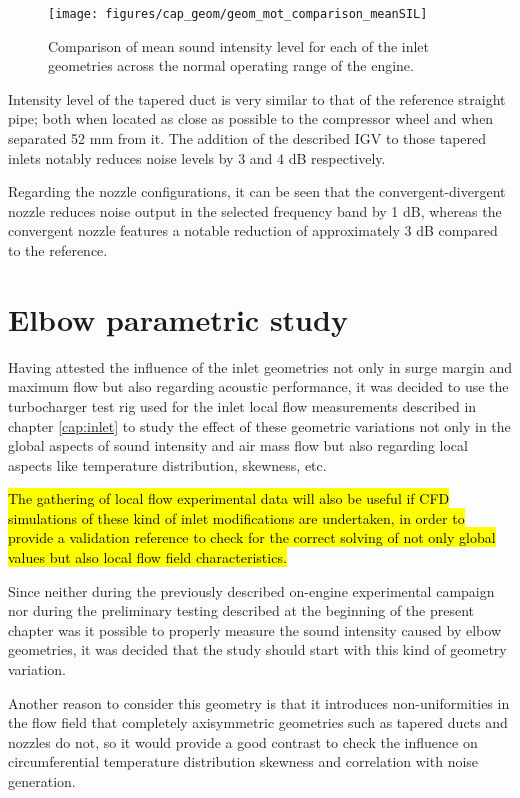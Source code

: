 \begin{figure}[h!]
\centering
\texttt{[image: figures/cap\_geom/geom\_mot\_comparison\_meanSIL]}
\caption{Comparison of mean sound intensity level for each of the inlet geometries across the normal operating range of the engine.}
\label{fig:geom_mot_comparison_meanSIL}
\end{figure}

Intensity level of the tapered duct is very similar to that of the reference straight pipe; both when located as close as possible to the compressor wheel and when separated 52 mm from it. The addition of the described IGV to those tapered inlets notably reduces noise levels by 3 and 4 dB respectively. 

Regarding the nozzle configurations, it can be seen that the convergent-divergent nozzle reduces noise output in the selected frequency band by 1 dB, whereas the convergent nozzle features a notable reduction of approximately 3 dB compared to the reference.

\section{Elbow parametric study}

Having attested the influence of the inlet geometries not only in surge margin and maximum flow but also regarding acoustic performance, it was decided to use the turbocharger test rig used for the inlet local flow measurements described in chapter \ref{cap:inlet} to study the effect of these geometric variations not only in the global aspects of sound intensity and air mass flow but also regarding local aspects like temperature distribution, skewness, etc.

\hl{The gathering of local flow experimental data will also be useful if CFD simulations of these kind of inlet modifications are undertaken, in order to provide a validation reference to check for the correct solving of not only global values but also local flow field characteristics.}

Since neither during the previously described on-engine experimental campaign nor during the preliminary testing described at the beginning of the present chapter was it possible to properly measure the sound intensity caused by elbow geometries, it was decided that the study should start with this kind of geometry variation.

Another reason to consider this geometry is that it introduces non-uniformities in the flow field that completely axisymmetric geometries such as tapered ducts and nozzles do not, so it would provide a good contrast to check the influence on circumferential temperature distribution skewness and correlation with noise generation.

